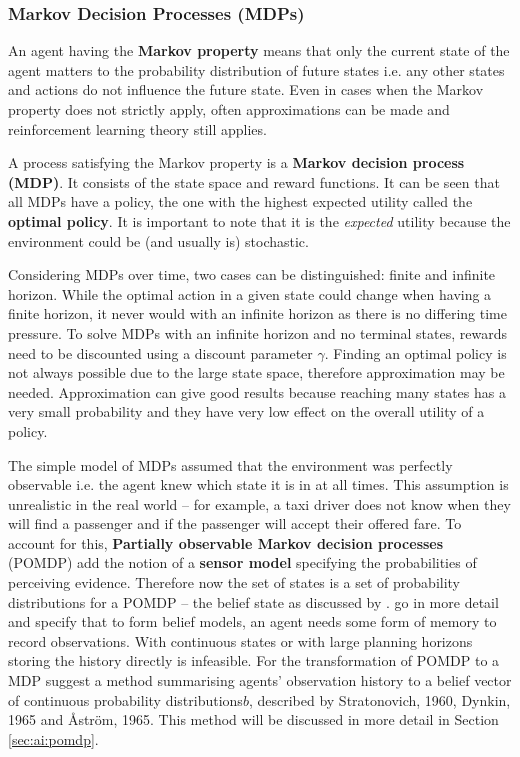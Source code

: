 \subsubsection{Markov Decision Processes (MDPs)}
\label{sec:ai:mdp}

An agent having the \textbf{Markov property} means that only the current state
of the agent matters to the probability distribution of future states i.e. any
other states and actions do not influence the future state. Even in cases when
the Markov property does not strictly apply, often approximations can be made
and reinforcement learning theory still applies.
\parencite{Sutton1998ai+reinforcement}

A process satisfying the Markov property is a \textbf{Markov decision process
(MDP)}. It consists of the state space and reward functions. It can be seen
that all MDPs have a policy, the one with the highest expected utility called
the \textbf{optimal policy}. It is important to note that it is the
\textit{expected} utility because the environment could be (and usually is)
stochastic. \parencite{Russell2010ai+modern}

Considering MDPs over time, two cases can be distinguished: finite and infinite
horizon. While the optimal action in a given state could change when having a
finite horizon, it never would with an infinite horizon as there is no
differing time pressure. To solve MDPs with an infinite horizon and no terminal
states, rewards need to be discounted using a discount parameter \(\gamma\).
Finding an optimal policy is not always possible due to the large state space,
therefore approximation may be needed. Approximation can give good results
because reaching many states has a very small probability and they have very
low effect on the overall utility of a policy. \parencite{Russell2010ai+modern}

The simple model of MDPs assumed that the environment was perfectly observable
i.e. the agent knew which state it is in at all times. This assumption is
unrealistic in the real world -- for example, a taxi driver does not know when
they will find a passenger and if the passenger will accept their offered fare.
To account for this, \textbf{Partially observable Markov decision processes}
(POMDP) add the notion of a \textbf{sensor model} specifying the probabilities
of perceiving evidence. Therefore now the set of states is a set of probability
distributions for a POMDP -- the belief state as discussed by
\textcite{Russell2010ai+modern}. \textcite{Spaan2012ai+pomdp} go in more detail
and specify that to form belief models, an agent needs some form of memory to
record observations. With continuous states or with large planning horizons
storing the history directly is infeasible. For the transformation of POMDP to
a MDP \textcite{Spaan2012ai+pomdp} suggest a method summarising agents'
observation history to a belief vector of continuous probability
distributions\(b\), described by Stratonovich, 1960, Dynkin, 1965 and Åström,
1965. This method will be discussed in more detail in Section
\ref{sec:ai:pomdp}.

